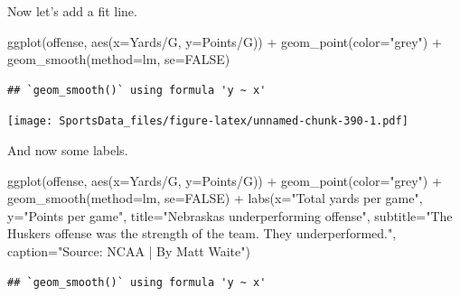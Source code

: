 \documentclass[
]{book}
\newenvironment{Shaded}{\begin{snugshade}}{\end{snugshade}}
\newcommand{\AttributeTok}[1]{\textcolor[rgb]{0.77,0.63,0.00}{#1}}
\newcommand{\ConstantTok}[1]{\textcolor[rgb]{0.00,0.00,0.00}{#1}}
\newcommand{\FunctionTok}[1]{\textcolor[rgb]{0.00,0.00,0.00}{#1}}
\newcommand{\NormalTok}[1]{#1}
\newcommand{\SpecialCharTok}[1]{\textcolor[rgb]{0.00,0.00,0.00}{#1}}
\newcommand{\StringTok}[1]{\textcolor[rgb]{0.31,0.60,0.02}{#1}}
\begin{document}
Now let's add a fit line.

\begin{Shaded}
\begin{Highlighting}[]
\FunctionTok{ggplot}\NormalTok{(offense, }\FunctionTok{aes}\NormalTok{(}\AttributeTok{x=}\StringTok{\textasciigrave{}}\AttributeTok{Yards/G}\StringTok{\textasciigrave{}}\NormalTok{, }\AttributeTok{y=}\StringTok{\textasciigrave{}}\AttributeTok{Points/G}\StringTok{\textasciigrave{}}\NormalTok{)) }\SpecialCharTok{+} 
  \FunctionTok{geom\_point}\NormalTok{(}\AttributeTok{color=}\StringTok{"grey"}\NormalTok{) }\SpecialCharTok{+} \FunctionTok{geom\_smooth}\NormalTok{(}\AttributeTok{method=}\NormalTok{lm, }\AttributeTok{se=}\ConstantTok{FALSE}\NormalTok{)}
\end{Highlighting}
\end{Shaded}

\begin{verbatim}
## `geom_smooth()` using formula 'y ~ x'
\end{verbatim}

\texttt{[image: SportsData\_files/figure-latex/unnamed-chunk-390-1.pdf]}

And now some labels.

\begin{Shaded}
\begin{Highlighting}[]
\FunctionTok{ggplot}\NormalTok{(offense, }\FunctionTok{aes}\NormalTok{(}\AttributeTok{x=}\StringTok{\textasciigrave{}}\AttributeTok{Yards/G}\StringTok{\textasciigrave{}}\NormalTok{, }\AttributeTok{y=}\StringTok{\textasciigrave{}}\AttributeTok{Points/G}\StringTok{\textasciigrave{}}\NormalTok{)) }\SpecialCharTok{+} 
  \FunctionTok{geom\_point}\NormalTok{(}\AttributeTok{color=}\StringTok{"grey"}\NormalTok{) }\SpecialCharTok{+} \FunctionTok{geom\_smooth}\NormalTok{(}\AttributeTok{method=}\NormalTok{lm, }\AttributeTok{se=}\ConstantTok{FALSE}\NormalTok{) }\SpecialCharTok{+} 
  \FunctionTok{labs}\NormalTok{(}\AttributeTok{x=}\StringTok{"Total yards per game"}\NormalTok{, }\AttributeTok{y=}\StringTok{"Points per game"}\NormalTok{, }\AttributeTok{title=}\StringTok{"Nebraska\textquotesingle{}s underperforming offense"}\NormalTok{, }\AttributeTok{subtitle=}\StringTok{"The Husker\textquotesingle{}s offense was the strength of the team. They underperformed."}\NormalTok{, }\AttributeTok{caption=}\StringTok{"Source: NCAA | By Matt Waite"}\NormalTok{)}
\end{Highlighting}
\end{Shaded}

\begin{verbatim}
## `geom_smooth()` using formula 'y ~ x'
\end{verbatim}
\end{document}
